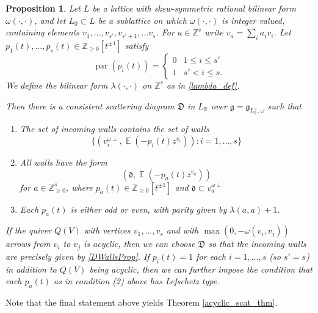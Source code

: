 \documentclass{amsart}
\DeclareMathOperator{\parit}{par}
\DeclareMathOperator{\EE}{\mathbb{E}}
\let\bb=\mathbb
\let\f=\mathfrak
\theoremstyle{plain}%
\newtheorem{prop}[thm]{Proposition}
\theoremstyle{definition}
\theoremstyle{remark}
\begin{document}
\begin{prop}
\label{Bridge_scat}
Let $L$ be a lattice with skew-symmetric rational bilinear form $\omega(\cdot,\cdot)$, and let $L_0\subset L$ be a sublattice on which $\omega(\cdot,\cdot)$ is integer valued, containing elements $v_1,\ldots,v_{s'},v_{s'+1},\ldots v_{s}$. For $a\in \mathbb{Z}^{s}$ write $v_a=\sum_i a_i v_i$.  Let $p_1(t),\ldots,p_{s}(t)\in\mathbb{Z}_{\geq 0}[t^{\pm 1}]$ satisfy 
\[
\parit(p_i(t))=\begin{cases} 0& 1\leq i\leq s'\\
1& s'<i\leq s.
\end{cases}
\]
We define the bilinear form $\lambda(\cdot,\cdot)$ on $\mathbb{Z}^{s}$ as in \eqref{lambda_def}.

Then there is a consistent scattering diagram $\f{D}$ in $L_{\bb{R}}$ over $\f{g}=\f{g}_{L_0^+,\omega}$ such that 
\begin{enumerate}
    \item The set of incoming walls contains the set of walls
    \begin{equation}\label{DWallsProp}
    \{(v_i^{\omega\perp},\EE(-p_i(t)z^{v_i}))\colon i=1,\ldots,s\}
    \end{equation}
    \item
    All walls have the form 
\[
    (\f{d},\EE(-p_a(t)z^{v_a}))\]
    for $a\in \mathbb{Z}^{s}_{\geq 0}$, where $p_a(t)\in\mathbb{Z}_{\geq 0}[t^{\pm 1}]$ and $\f{d}\subset v_a^{\omega\perp}$
    \item
    Each $p_a(t)$ is either odd or even, with parity given by $\lambda(a,a)+1$.
\end{enumerate}
If the quiver $Q(V)$ with vertices $v_1,\ldots,v_s$ and with $\max(0,-\omega(v_i,v_j))$ arrows from $v_i$ to $v_j$ is acyclic, then we can choose $\f{D}$ so that the incoming walls are precisely given by \eqref{DWallsProp}.  If $p_i(t)=1$ for each $i=1,\ldots,s$ (so $s'=s$) in addition to $Q(V)$ being acyclic, then we can further impose the condition that each $p_a(t)$ as in condition (2) above has Lefschetz type.
\end{prop}
Note that the final statement above yields Theorem \ref{acyclic_scat_thm}.
\end{document}
